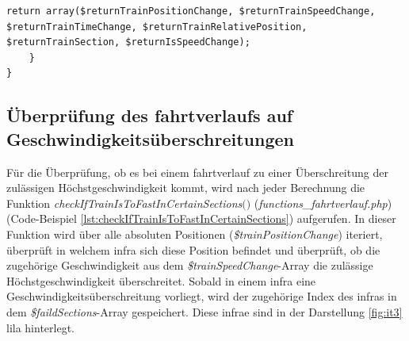 \begin{lstlisting}[caption={\textit{createTrainChanges$($$)$} (\textit{functions\_fahrtverlauf.php})},captionpos=b,label={lst:createTrainChanges}]
		return array($returnTrainPositionChange, $returnTrainSpeedChange, $returnTrainTimeChange, $returnTrainRelativePosition, $returnTrainSection, $returnIsSpeedChange);
	}
}
\end{lstlisting}
\subsection{Überprüfung des \Gls{fahrtverlauf}s auf Geschwindigkeitsüberschreitungen} \label{überprüfung}
Für die Überprüfung, ob es bei einem \Gls{fahrtverlauf} zu einer Überschreitung der zulässigen Höchstgeschwindigkeit kommt, wird nach jeder Berechnung die Funktion \textit{check\-If\-Train\-Is\-To\-Fast\-In\-Certain\-Sec\-tions$($$)$} (\textit{functions\_fahrtverlauf.php}) (Code-Beispiel \ref{lst:checkIfTrainIsToFastInCertainSections}) aufgerufen. In dieser Funktion wird über alle absoluten Positionen (\textit{\$trainPositionChange}) iteriert, überprüft in welchem \ac{infra} sich diese Position befindet und überprüft, ob die zugehörige Geschwindigkeit aus dem \textit{\$trainSpeedChange}-Array die zulässige Höchstgeschwindigkeit überschreitet. Sobald in einem \ac{infra} eine Geschwindigkeitsüberschreitung vorliegt, wird der zugehörige Index des \ac{infra}s in dem \textit{\$faildSections}-Array gespeichert. Diese \ac{infra}e sind in der Darstellung \ref{fig:it3} lila hinterlegt. 

